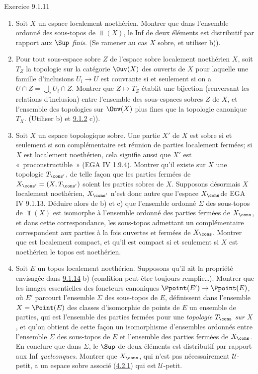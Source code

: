 \documentclass[10pt]{../fichiers-configuration-latex/smfart}
\begin{document}
\begin{enonce*}[remark]{Exercice 9.1.11}
\begin{enumerate}
\item Soit $X$ un espace localement noethérien. Montrer que dans
l'ensemble ordonné des sous-topos de $\Top(X)$, le Inf de deux
éléments est distributif par rapport aux $\Sup$ \emph{finis}. (Se
ramener au cas $X$ sobre, et utiliser b)).

\item Pour tout sous-espace sobre $Z$ de l'espace sobre localement
noethérien $X$, soit $T_Z$ la topologie sur la catégorie $\Ouv(X)$
des ouverts de $X$ pour laquelle une famille d'inclusions
$U_i\rightarrow U$ est couvrante si et seulement si on a $U\cap
Z=\bigcup_i U_i \cap Z$. Montrer que $Z\mapsto T_Z$ établit une
bijection (renversant les relations d'inclusion) entre l'ensemble
des sous-espaces sobres $Z$ de $X$, et l'ensemble des topologies sur
$\Ouv(X)$ plus fines que la topologie canonique $T_X$. (Utiliser b)
et \hyperref[IV.rem9.1.2]{9.1.2} c)).

\item Soit $X$ un espace topologique sobre. Une partie $X'$ de $X$ est
sobre si et seulement si son complémentaire est réunion de parties
localement fermées; si $X$ est localement noethérien, cela signifie
aussi que $X'$ est « proconstructible »  (EGA IV 1.9.4). Montrer
qu'il existe sur $X$ une topologie $T_{\cons'}$, de telle façon
que les parties fermées de $X_{\cons'}=(X,T_{\cons'})$ soient les
parties sobres de $X$. Supposons désormais $X$ localement
noethérien, $X_{\cons'}$ n'est donc autre que l'espace
$X_{\cons}$\pageoriginale de EGA IV 9.1.13. Déduire alors de b) et c)
que l'ensemble ordonné $\Sigma$ des sous-topos de $\Top(X)$ est
isomorphe à l'ensemble ordonné des parties fermées de $X_{\cons}$,
et dans cette correspondance, les sous-topos admettant un
complémentaire correspondent aux parties à la fois ouvertes et
fermées de $X_{\cons}$. Montrer que  est localement compact, et
qu'il est compact si et seulement si $X$ est noethérien \ie le topos
 est noethérien.

\item Soit $E$ un topos localement noethérien. Supposons qu'il ait la
propriété envisagée dans \hyperref[IV.subsubsec9.1.14]{9.1.14} b) (condition
peut-être toujours remplie\ldots). Montrer que les images
essentielles des foncteurs canoniques $\Ppoint(E')\rightarrow
\Ppoint(E)$, où $E'$ parcourt l'ensemble $\Sigma$ des sous-topos de
$E$, définissent dans l'ensemble $X=\Point(E)$ des classes
d'isomorphie de points de $E$ un ensemble de parties, qui est
l'ensemble des parties fermées pour une \emph{topologie} $T_{\cons}$
\emph{sur} $X$, et qu'on obtient de cette façon un isomorphisme
d'ensembles ordonnés entre l'ensemble $\Sigma$ des sous-topos de $E$
et l'ensemble des parties fermées de $X_{\cons}$. En conclure que
dans $\Sigma$, le $\Sup$ de deux éléments est distributif par
rapport aux Inf \emph{quelconques}. Montrer que $X_{\cons}$, qui
n'est pas nécessairement $𝒰$-petit, a un espace sobre
associé (\hyperref[IV.subsubsec4.2.1]{4.2.1}) qui est $𝒰$-petit.
\end{enumerate}
\end{enonce*}
\end{document}
